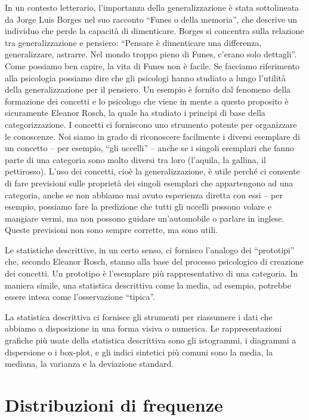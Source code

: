 In un contesto letterario, l'importanza della generalizzazione è stata sottolineata da Jorge Luis Borges nel suo racconto \enquote{Funes o della memoria}, che descrive un individuo che perde la capacità di dimenticare. 
Borges si concentra sulla relazione tra generalizzazione e pensiero: \enquote{Pensare è dimenticare una differenza, generalizzare, astrarre. 
Nel mondo troppo pieno di Funes, c'erano solo dettagli}.
Come possiamo ben capire, la vita di Funes non è facile.
Se facciamo riferimento alla psicologia possiamo dire che gli psicologi hanno studiato a lungo l'utilità della generalizzazione per il pensiero. 
Un esempio è fornito dal fenomeno della formazione dei concetti e lo psicologo che viene in mente a questo proposito è sicuramente Eleanor Rosch, la quale ha studiato i principi di base della categorizzazione.
I concetti ci forniscono uno strumento potente per organizzare le conoscenze.
Noi siamo in grado di riconoscere facilmente i diversi esemplare di un concetto -- per esempio,  \enquote{gli uccelli} -- anche se i singoli esemplari che fanno parte di una categoria sono molto diversi tra loro (l'aquila, la gallina, il pettirosso). 
L'uso dei concetti, cioè la generalizzazione, è utile perché ci consente di fare previsioni sulle proprietà dei singoli esemplari che appartengono ad una categoria, anche se non abbiamo mai avuto esperienza diretta con essi -- per esempio, possiamo fare la predizione che tutti gli uccelli possono volare e mangiare vermi, ma non possono guidare un'automobile o parlare in inglese. 
Queste previsioni non sono sempre corrette, ma sono utili. 

Le statistiche descrittive, in un certo senso, ci fornisco l'analogo dei \enquote{prototipi} che, secondo Eleanor Rosch, stanno alla base del processo psicologico di creazione dei concetti.
Un prototipo è l'esemplare più rappresentativo di una categoria.
In maniera simile, una statistica descrittiva come la media, ad esempio, potrebbe essere intesa come l'osservazione \enquote{tipica}.

La statistica descrittiva ci fornisce gli strumenti per riassumere i dati che abbiamo a disposizione in una forma visiva o numerica.
Le rappresentazioni grafiche più usate della statistica descrittiva sono gli istogrammi, i diagrammi a dispersione o i box-plot, e gli indici sintetici più comuni sono la media, la mediana, la varianza e la deviazione standard.


\section{Distribuzioni di frequenze}
\label{sec:distr_freq}

